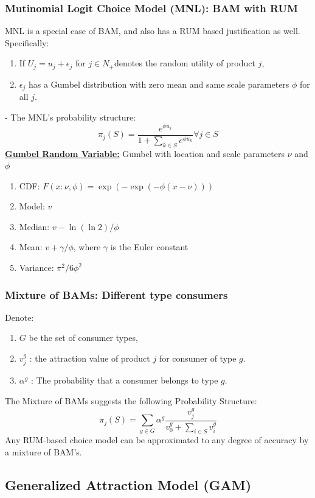 \documentclass[11pt,a4paper]{article}
\begin{document}
\subsubsection{Mutinomial Logit Choice Model (MNL): BAM with RUM}
MNL is a special case of BAM, and also has a RUM based justification as well. Specifically:
\begin{enumerate}[$\bullet$]
    \item If $U_{j}=u_{j}+\epsilon_{j}$ for $j \in N_{+}$denotes the random utility of product $j$,
    \item $\epsilon_{j}$ has a Gumbel distribution with zero mean and same scale parameters $\phi$ for all $j$.
\end{enumerate}
- The MNL's probability structure:
$$
\pi_{j}(S)=\frac{e^{\phi u_{j}}}{1+\sum_{k \in S} e^{\phi u_{k}}} \forall j \in S
$$
\underline{\textbf{Gumbel Random Variable:}} Gumbel with location and scale parameters $\nu$ and $\phi$
\begin{enumerate}[$\bullet$]
    \item CDF:
    $
    F(x: \nu, \phi)=\exp (-\exp (-\phi(x-\nu)))
    $
    \item Model: $v$
    \item Median: $v-\ln (\ln 2) / \phi$
    \item Mean: $v+\gamma / \phi$, where $\gamma$ is the Euler constant
    \item Variance: $\pi^{2} / 6 \phi^{2}$
\end{enumerate}

\subsubsection{Mixture of BAMs: Different type consumers}
Denote:
\begin{enumerate}[$\bullet$]
    \item $G$ be the set of consumer types,
    \item $v_{j}^{g}$ : the attraction value of product $j$ for consumer of type $g$.
    \item $\alpha^{g}$ : The probability that a consumer belongs to type $g$.
\end{enumerate}
The Mixture of BAMs suggests the following Probability Structure:
$$
\pi_{j}(S)=\sum_{g \in G} \alpha^{g} \frac{v_{j}^{g}}{v_{0}^{g}+\sum_{i \in S} v_{i}^{g}}
$$
Any RUM-based choice model can be approximated to any degree of accuracy by a mixture of BAM's.

\subsection{Generalized Attraction Model (GAM)}
\end{document}
